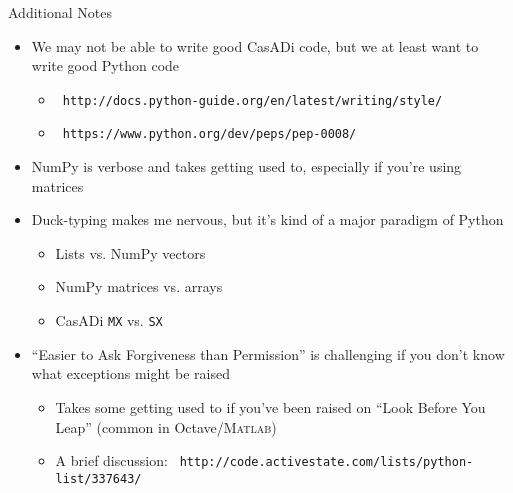 \documentclass[xcolor=dvipsnames]{beamer}
\newcommand{\smallurl}[2][\footnotesize]{\texttt{#1 #2}}
\begin{document}
\begin{frame}{Additional Notes}

\begin{itemize}
    \item We may not be able to write good CasADi code, but we at least want to write good Python code
    \begin{itemize}
        \item \smallurl{http://docs.python-guide.org/en/latest/writing/style/}
        \item \smallurl{https://www.python.org/dev/peps/pep-0008/}
    \end{itemize}
    \item NumPy is verbose and takes getting used to, especially if you're using matrices
    \item Duck-typing makes me nervous, but it's kind of a major paradigm of Python
    \begin{itemize}
        \item Lists vs. NumPy vectors
        \item NumPy matrices vs. arrays
        \item CasADi \texttt{MX} vs. \texttt{SX}
    \end{itemize}
    \item ``Easier to Ask Forgiveness than Permission'' is challenging if you don't know what exceptions might be raised
    \begin{itemize}
        \item Takes some getting used to if you've been raised on ``Look Before You Leap'' (common in Octave/\textsc{Matlab})
        \item A brief discussion: \smallurl{http://code.activestate.com/lists/python-list/337643/}
    \end{itemize}
\end{itemize}

\end{frame}
\end{document}
